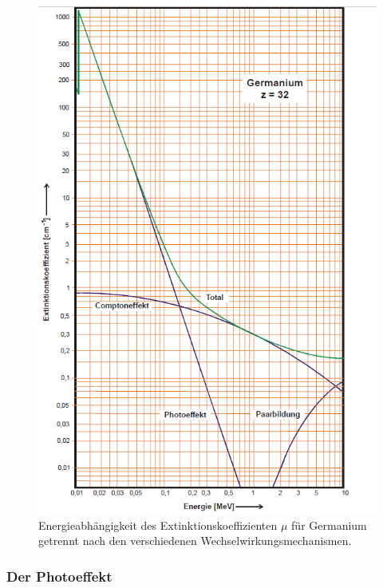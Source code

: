 \begin{figure}
	\centering
	\includegraphics[width=\linewidth-70pt,height=\textheight-70pt,keepaspectratio]{content/images/sigma.png}
	\caption{Energieabhängigkeit des Extinktionskoeffizienten $\mu$ für Germanium getrennt nach den verschiedenen Wechselwirkungsmechanismen\cite{V18}.}
	\label{fig:Wirkungsquerschnitt}
\end{figure}

\subsubsection{Der Photoeffekt}

